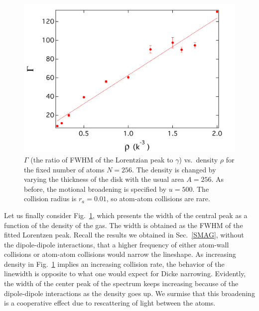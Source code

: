 \begin{figure}[h!]
\begin{center}
\includegraphics[width=\textwidth]{FWHM.pdf}
\end{center}
\caption{$\Gamma$ (the ratio of FWHM of the Lorentzian peak to $\gamma$) vs.\ density $\rho$ for the fixed number of atoms $N=256$. The density is changed by varying the thickness of the disk with the usual area $A=256$. As before, the motional broadening is specified by $u=500$. The collision radius is $r_a=0.01$, so atom-atom collisions are rare.}
\label{FWHM}
\end{figure}

Let us finally consider Fig.~\ref{FWHM}, which presents the width of the central peak as a function of the density of the gas. The width is obtained as the FWHM of the fitted Lorentzen peak. Recall the results we obtained in Sec.~\ref{SMAG}, without the dipole-dipole interactions, that a higher frequency of either atom-wall collisions or atom-atom collisions would narrow the lineshape. As increasing density in Fig.~\ref{FWHM} implies an increasing collision rate, the behavior of the linewidth is opposite to what one would expect for Dicke narrowing. Evidently, the width of the center peak of the spectrum keeps increasing because of the dipole-dipole interactions as the density goes up.  We surmise that this broadening is a cooperative effect due to rescattering of light between the atoms.
